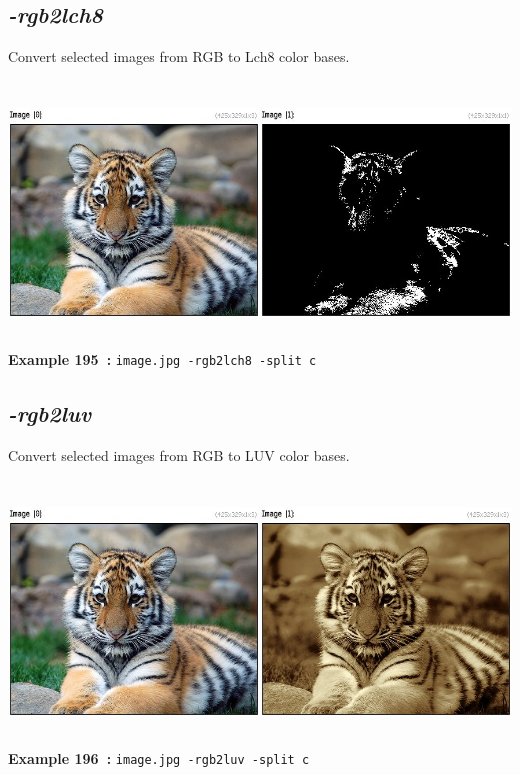 \documentclass[a4paper,11pt,twoside]{book}
\begin{document}
\subsection{\emph{-rgb2lch8} }\vspace*{-0.5em}
Convert selected images from RGB to Lch8 color bases.
\begin{center}\includegraphics[keepaspectratio=true,height=7cm,width=\textwidth]{img/gmic_def195.jpg}\\
{\footnotesize \textbf{Example 195~:} \texttt{image.jpg -rgb2lch8 -split c}}
\end{center}

\subsection{\emph{-rgb2luv} }\vspace*{-0.5em}
Convert selected images from RGB to LUV color bases.
\begin{center}\includegraphics[keepaspectratio=true,height=7cm,width=\textwidth]{img/gmic_def196.jpg}\\
{\footnotesize \textbf{Example 196~:} \texttt{image.jpg -rgb2luv -split c}}
\end{center}
\end{document}
